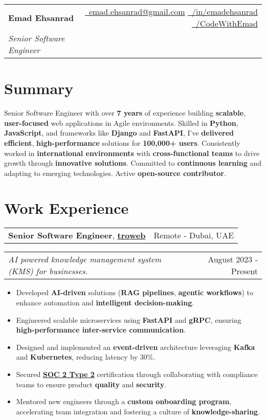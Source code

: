 \documentclass[letterpaper,11pt]{article}
\makeatletter
\newcommand{\resumeFullHeading}[5]{
   \begin{tabular*}{\textwidth}{l@{\extracolsep{\fill}}r}
       \textbf{\Huge #1}\vspace{5px} &
       \small{\href{mailto:#3}{\raisebox{-0.05\height}\faEnvelope \ #3}} \quad
       \small{\href{#4}{\raisebox{-0.05\height}\faLinkedin\ /in/emadehsanrad}} \quad
       \small{\href{#5}{\raisebox{-0.05\height}\faGithub\ /CodeWithEmad}} \\
       \textit{\large #2} & \\
   \end{tabular*}
}
\newcommand{\resumeFullHeadingWithImage}[7]{%
    \begin{minipage}[t]{0.7\textwidth}
        \huge\textbf{#1}\\[0.2em]
        \Large\textit{#2}\\[1em]
        \small{#3 #4 #5}
    \end{minipage}%
    \begin{minipage}[t]{0.3\textwidth}
        \raggedleft
        \raisebox{-2cm}[0pt][0pt]{\texttt{[image: \#6]}}
    \end{minipage}
}
\newcommand{\resumeItemSimple}[1]{
  \item\small{
    {#1}
  }
}
\newcommand{\resumeSubheadingSimple}[5]{
    \begin{tabular*}{1\textwidth}[t]{l@{\extracolsep{\fill}}r}
      \textbf{#1}, \textbf{\href{#3}{#2}} \space \small#4 & \small#5 \\
    \end{tabular*}
}
\newcommand{\resumeSubSubheading}[2]{
    \begin{tabular*}{1\textwidth}{l@{\extracolsep{\fill}}r}
      \textit{\small#1} & \small #2 \\
    \end{tabular*}\vspace{-1pt}
}
\newcommand{\resumeItemListStart}{\begin{itemize}[leftmargin=0.5cm, itemsep=1pt, parsep=0pt]} %
\newcommand{\resumeItemListEnd}{\end{itemize}}
\makeatother
\begin{document}
\resumeFullHeading
  {Emad Ehsanrad}
  {Senior Software Engineer}
  {emad.ehsanrad@gmail.com}
  {https://www.linkedin.com/in/emadehsanrad/}
  {https://github.com/codewithemad}


\section{Summary}
\small
Senior Software Engineer with over \textbf{7 years} of experience building \textbf{scalable},
\textbf{user-focused} web applications in Agile environments.
Skilled in \textbf{Python}, \textbf{JavaScript}, and frameworks like \textbf{Django} and \textbf{FastAPI},
I've \textbf{delivered efficient}, \textbf{high-performance} solutions for \textbf{100,000+ users}.
Consistently worked in \textbf{international environments} with \textbf{cross-functional teams}
to drive growth through \textbf{innovative solutions}. Committed to \textbf{continuous learning}
and adapting to emerging technologies. Active \textbf{open-source contributor}.

\section{Work Experience}

    \resumeSubheadingSimple
      {Senior Software Engineer}{troweb}{https://www.linkedin.com/company/troweb/}{}{Remote - Dubai, UAE}
      \resumeSubSubheading{AI powered knowledge management system (KMS) for businesses.}{August 2023 - Present}
      \resumeItemListStart
        \resumeItemSimple{Developed \textbf{AI-driven} solutions (\textbf{RAG pipelines}, \textbf{agentic workflows}) to enhance automation and \textbf{intelligent decision-making}.}
        \resumeItemSimple{Engineered scalable microservices using \textbf{FastAPI} and \textbf{gRPC}, ensuring \textbf{high-performance inter-service communication}.}
        \resumeItemSimple{Designed and implemented an \textbf{event-driven} architecture leveraging \textbf{Kafka} and \textbf{Kubernetes}, reducing latency by 30\%.}        \resumeItemSimple{Secured \href{https://sprinto.com/blog/soc-2-type-2/}{\textbf{SOC 2 Type 2}} certification through collaborating with compliance teams to ensure product \textbf{quality} and \textbf{security}.}
        \resumeItemSimple{Mentored new engineers through a \textbf{custom onboarding program}, accelerating team integration and fostering a culture of \textbf{knowledge-sharing}.}
      \resumeItemListEnd
\end{document}
